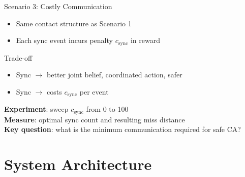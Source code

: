 \documentclass[aspectratio=169]{beamer}
\newcommand{\good}[1]{\textcolor{green!60!black}{#1}}
\newcommand{\bad}[1]{\textcolor{red!70!black}{#1}}
\begin{document}
\begin{frame}{Scenario 3: Costly Communication}
  \begin{itemize}
    \item Same contact structure as Scenario 1
    \item Each sync event incurs penalty $c_\text{sync}$ in reward
  \end{itemize}
  \vspace{0.5em}
  \begin{block}{Trade-off}
    \begin{itemize}
      \item \good{Sync} $\rightarrow$ better joint belief, coordinated action, safer
      \item \bad{Sync} $\rightarrow$ costs $c_\text{sync}$ per event
    \end{itemize}
  \end{block}
  \vspace{0.5em}
  \textbf{Experiment}: sweep $c_\text{sync}$ from 0 to 100\\[0.3em]
  \textbf{Measure}: optimal sync count and resulting miss distance\\[0.3em]
  \textbf{Key question}: what is the minimum communication required for safe CA?
\end{frame}

\section{System Architecture}
\end{document}
